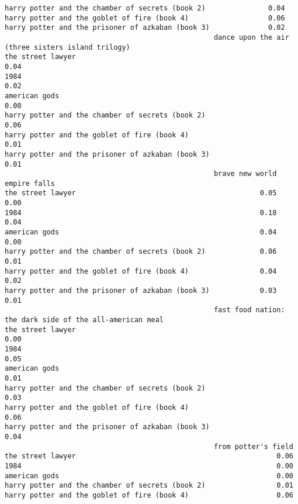 \documentclass[
]{report}
\begin{document}
\begin{verbatim}
harry potter and the chamber of secrets (book 2)               0.04
harry potter and the goblet of fire (book 4)                   0.06
harry potter and the prisoner of azkaban (book 3)              0.02
                                                  dance upon the air (three sisters island trilogy)
the street lawyer                                                                              0.04
1984                                                                                           0.02
american gods                                                                                  0.00
harry potter and the chamber of secrets (book 2)                                               0.06
harry potter and the goblet of fire (book 4)                                                   0.01
harry potter and the prisoner of azkaban (book 3)                                              0.01
                                                  brave new world empire falls
the street lawyer                                            0.05         0.00
1984                                                         0.18         0.04
american gods                                                0.04         0.00
harry potter and the chamber of secrets (book 2)             0.06         0.01
harry potter and the goblet of fire (book 4)                 0.04         0.02
harry potter and the prisoner of azkaban (book 3)            0.03         0.01
                                                  fast food nation: the dark side of the all-american meal
the street lawyer                                                                                     0.00
1984                                                                                                  0.05
american gods                                                                                         0.01
harry potter and the chamber of secrets (book 2)                                                      0.03
harry potter and the goblet of fire (book 4)                                                          0.06
harry potter and the prisoner of azkaban (book 3)                                                     0.04
                                                  from potter's field
the street lawyer                                                0.06
1984                                                             0.00
american gods                                                    0.00
harry potter and the chamber of secrets (book 2)                 0.01
harry potter and the goblet of fire (book 4)                     0.06

\end{verbatim}
\end{document}
